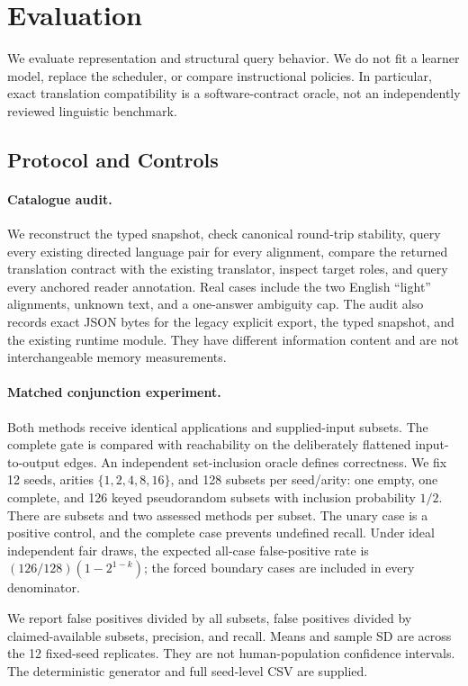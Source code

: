 \documentclass{article}
\begin{document}
\section{Evaluation}
\label{sec:evaluation}

We evaluate representation and structural query behavior. We do not fit a learner model, replace the scheduler, or compare instructional policies. In particular, exact translation compatibility is a software-contract oracle, not an independently reviewed linguistic benchmark.

\subsection{Protocol and Controls}

\paragraph{Catalogue audit.}
We reconstruct the typed snapshot, check canonical round-trip stability, query every existing directed language pair for every alignment, compare the returned translation contract with the existing translator, inspect target roles, and query every anchored reader annotation. Real cases include the two English ``light'' alignments, unknown text, and a one-answer ambiguity cap. The audit also records exact JSON bytes for the legacy explicit export, the typed snapshot, and the existing runtime module. They have different information content and are not interchangeable memory measurements.

\paragraph{Matched conjunction experiment.}
Both methods receive identical applications and supplied-input subsets. The complete gate is compared with reachability on the deliberately flattened input-to-output edges. An independent set-inclusion oracle defines correctness. We fix 12 seeds, arities $\{1,2,4,8,16\}$, and 128 subsets per seed/arity: one empty, one complete, and 126 keyed pseudorandom subsets with inclusion probability $1/2$. There are \GraphSubsets{} subsets and two assessed methods per subset. The unary case is a positive control, and the complete case prevents undefined recall. Under ideal independent fair draws, the expected all-case false-positive rate is $(126/128)(1-2^{1-k})$; the forced boundary cases are included in every denominator.

We report false positives divided by all subsets, false positives divided by claimed-available subsets, precision, and recall. Means and sample SD are across the 12 fixed-seed replicates. They are not human-population confidence intervals. The deterministic generator and full seed-level CSV are supplied.
\end{document}
